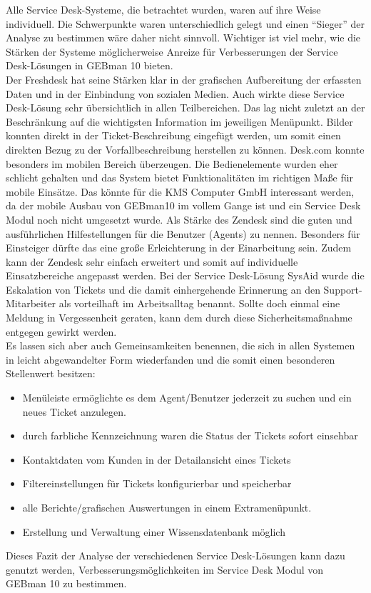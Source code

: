 \noindent
Alle Service Desk-Systeme, die betrachtet wurden, waren auf ihre Weise individuell. Die Schwerpunkte waren unterschiedlich gelegt und einen \enquote{Sieger} der Analyse zu bestimmen wäre daher nicht sinnvoll. Wichtiger ist viel mehr, wie die Stärken der Systeme möglicherweise Anreize für Verbesserungen der Service Desk-Lösungen in GEBman 10 bieten.\\
\noindent
Der Freshdesk hat seine Stärken klar in der grafischen Aufbereitung der erfassten Daten und in der Einbindung von sozialen Medien. Auch wirkte diese Service Desk-Lösung sehr übersichtlich in allen Teilbereichen. Das lag nicht zuletzt an der Beschränkung auf die wichtigsten Information im jeweiligen Menüpunkt. Bilder konnten direkt in der Ticket-Beschreibung eingefügt werden, um somit einen direkten Bezug zu der Vorfallbeschreibung herstellen zu können.
\newline
Desk.com konnte besonders im mobilen Bereich überzeugen. Die Bedienelemente wurden eher schlicht gehalten und das System bietet Funktionalitäten im richtigen Maße für mobile Einsätze. Das könnte für die KMS Computer GmbH interessant werden, da der mobile Ausbau von GEBman10 im vollem Gange ist und ein Service Desk Modul noch nicht umgesetzt wurde. \newline
Als Stärke des Zendesk sind die guten und ausführlichen Hilfestellungen für die Benutzer (Agents) zu nennen. Besonders für Einsteiger dürfte das eine große Erleichterung in der Einarbeitung sein. Zudem kann der Zendesk sehr einfach erweitert und somit auf individuelle Einsatzbereiche angepasst werden. \newline
Bei der Service Desk-Lösung SysAid wurde die Eskalation von Tickets und die damit einhergehende Erinnerung an den Support-Mitarbeiter als vorteilhaft im Arbeitsalltag benannt. Sollte doch einmal eine Meldung in Vergessenheit geraten, kann dem durch diese Sicherheitsmaßnahme entgegen gewirkt werden.\\


\noindent
Es lassen sich aber auch Gemeinsamkeiten benennen, die sich in allen Systemen in leicht abgewandelter Form wiederfanden und die somit einen besonderen Stellenwert besitzen:

\begin{itemize}
\item Menüleiste ermöglichte es dem Agent/Benutzer jederzeit zu suchen und ein neues Ticket anzulegen.
		 
\item durch farbliche Kennzeichnung waren die Status der Tickets sofort einsehbar
		
\item  Kontaktdaten vom Kunden in der Detailansicht eines Tickets

\item Filtereinstellungen für Tickets konfigurierbar und speicherbar

\item alle Berichte/grafischen Auswertungen in einem Extramenüpunkt.

\item Erstellung und Verwaltung einer Wissensdatenbank möglich
\end{itemize}

\noindent
Dieses Fazit der Analyse der verschiedenen Service Desk-Lösungen kann dazu genutzt werden, Verbesserungsmöglichkeiten im Service Desk Modul von GEBman 10 zu  bestimmen. 
